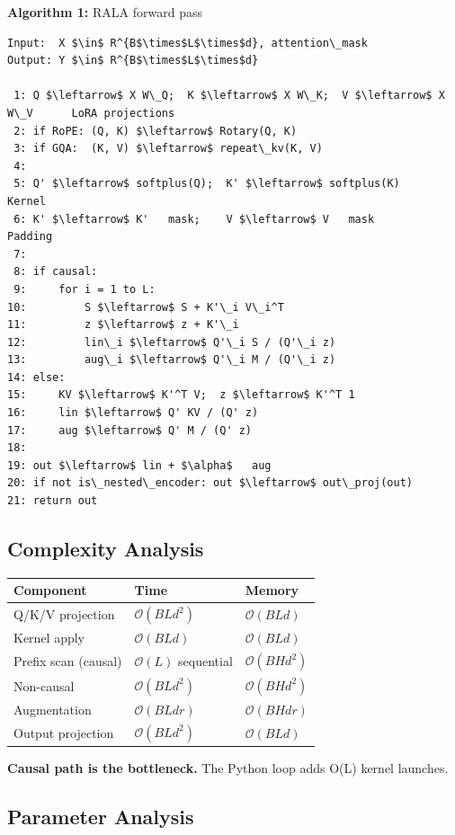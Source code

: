 \textbf{Algorithm 1:} RALA forward pass
\begin{lstlisting}
Input:  X $\in$ R^{B$\times$L$\times$d}, attention\_mask
Output: Y $\in$ R^{B$\times$L$\times$d}

 1: Q $\leftarrow$ X W\_Q;  K $\leftarrow$ X W\_K;  V $\leftarrow$ X W\_V      LoRA projections
 2: if RoPE: (Q, K) $\leftarrow$ Rotary(Q, K)
 3: if GQA:  (K, V) $\leftarrow$ repeat\_kv(K, V)
 4:
 5: Q' $\leftarrow$ softplus(Q);  K' $\leftarrow$ softplus(K)     Kernel
 6: K' $\leftarrow$ K'   mask;    V $\leftarrow$ V   mask         Padding
 7:
 8: if causal:
 9:     for i = 1 to L:
10:         S $\leftarrow$ S + K'\_i V\_i^T
11:         z $\leftarrow$ z + K'\_i
12:         lin\_i $\leftarrow$ Q'\_i S / (Q'\_i z)
13:         aug\_i $\leftarrow$ Q'\_i M / (Q'\_i z)
14: else:
15:     KV $\leftarrow$ K'^T V;  z $\leftarrow$ K'^T 1
16:     lin $\leftarrow$ Q' KV / (Q' z)
17:     aug $\leftarrow$ Q' M / (Q' z)
18:
19: out $\leftarrow$ lin + $\alpha$   aug
20: if not is\_nested\_encoder: out $\leftarrow$ out\_proj(out)
21: return out
\end{lstlisting}

\subsection{Complexity Analysis}

\begin{table}[H]
\centering
\small
\begin{tabular}{lll}
\toprule
\textbf{Component} & \textbf{Time} & \textbf{Memory} \\
\midrule
Q/K/V projection & $\mathcal{O}(BL d^2)$ & $\mathcal{O}(BLd)$ \\
Kernel apply & $\mathcal{O}(BLd)$ & $\mathcal{O}(BLd)$ \\
Prefix scan (causal) & $\mathcal{O}(L)$ sequential & $\mathcal{O}(BH d^2)$ \\
Non-causal & $\mathcal{O}(BLd^2)$ & $\mathcal{O}(BHd^2)$ \\
Augmentation & $\mathcal{O}(BL d r)$ & $\mathcal{O}(BH d r)$ \\
Output projection & $\mathcal{O}(BLd^2)$ & $\mathcal{O}(BLd)$ \\
\bottomrule
\end{tabular}
\end{table}

\textbf{Causal path is the bottleneck.} The Python loop adds O(L) kernel launches.

\subsection{Parameter Analysis}

